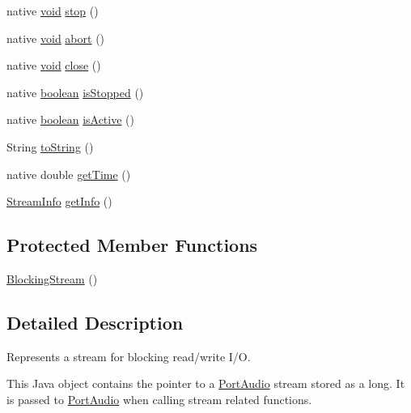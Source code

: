 \begin{DoxyCompactItemize}
\item 
native \hyperlink{sound_8c_ae35f5844602719cf66324f4de2a658b3}{void} \hyperlink{classcom_1_1portaudio_1_1_blocking_stream_a912f5332bc0c5f610ec94bf583a3e2d6}{stop} ()
\item 
native \hyperlink{sound_8c_ae35f5844602719cf66324f4de2a658b3}{void} \hyperlink{classcom_1_1portaudio_1_1_blocking_stream_a9897ea14063ab8e9cf01da7f0c71dcf3}{abort} ()
\item 
native \hyperlink{sound_8c_ae35f5844602719cf66324f4de2a658b3}{void} \hyperlink{classcom_1_1portaudio_1_1_blocking_stream_a8aa21c90665dbd02b7578ec83aa7bc38}{close} ()
\item 
native \hyperlink{cext_8h_a7670a4e8a07d9ebb00411948b0bbf86d}{boolean} \hyperlink{classcom_1_1portaudio_1_1_blocking_stream_af7302d39a2f9d2fc698f6bec0cc22abc}{is\+Stopped} ()
\item 
native \hyperlink{cext_8h_a7670a4e8a07d9ebb00411948b0bbf86d}{boolean} \hyperlink{classcom_1_1portaudio_1_1_blocking_stream_abe5907d29a3873b1ed0c5f53aa349d51}{is\+Active} ()
\item 
String \hyperlink{classcom_1_1portaudio_1_1_blocking_stream_a2ae8348af5928fd48cd6da8e1cef762e}{to\+String} ()
\item 
native double \hyperlink{classcom_1_1portaudio_1_1_blocking_stream_a1768a144ac219d3ce7682ac8422d20f2}{get\+Time} ()
\item 
\hyperlink{classcom_1_1portaudio_1_1_stream_info}{Stream\+Info} \hyperlink{classcom_1_1portaudio_1_1_blocking_stream_a760ca3c640acd287074bfa222b052270}{get\+Info} ()
\end{DoxyCompactItemize}
\subsection*{Protected Member Functions}
\begin{DoxyCompactItemize}
\item 
\hyperlink{classcom_1_1portaudio_1_1_blocking_stream_a0039bea2839321cea21e95036a309d0d}{Blocking\+Stream} ()
\end{DoxyCompactItemize}


\subsection{Detailed Description}
Represents a stream for blocking read/write I/O.

This Java object contains the pointer to a \hyperlink{classcom_1_1portaudio_1_1_port_audio}{Port\+Audio} stream stored as a long. It is passed to \hyperlink{classcom_1_1portaudio_1_1_port_audio}{Port\+Audio} when calling stream related functions.

